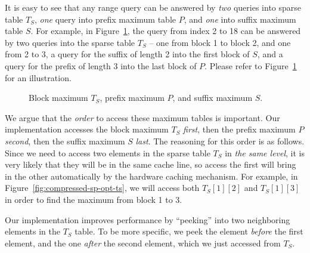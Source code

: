 It is easy to see that any range query can be answered by {\em two}
queries into sparse table $T_S$, {\em one} query into prefix maximum
table $P$, and {\em one} into suffix maximum table $S$.  For example, in
Figure~\ref{fig:compressed-sp-opt}, the query from index 2 to 18 can be
answered by two queries into the sparse table $T_S$ -- one from block 1
to block 2, and one from 2 to 3, a query for the suffix of length 2 into
the first block of $S$, and a query for the prefix of length 3 into the
last block of $P$.  Please refer to Figure~\ref{fig:compressed-sp-opt}
for an illustration.



\begin{figure}[!thb]
  \centering {}  \caption{Block maximum $T_S$, prefix maximum $P$, and suffix maximum $S$.}
  \label{fig:compressed-sp-opt}
\end{figure}

We argue that the {\em order} to access these maximum tables is
important.  Our implementation accesses the block maximum $T_S$ {\em
first}, then the prefix maximum $P$ {\em second}, then the suffix
maximum $S$ {\em last}.  The reasoning for this order is as follows.
Since we need to access two elements in the sparse table $T_S$ in {\em
the same level}, it is very likely that they will be in the same cache
line, so access the first will bring in the other automatically by the
hardware caching mechanism.  For example, in
Figure~\ref{fig:compressed-sp-opt-ts}, we will access both $T_{S}[1][2]$
and $T_{S}[1][3]$ in order to find the maximum from block 1 to 3.

Our implementation improves performance by ``peeking'' into two
neighboring elements in the $T_{S}$ table.  To be more specific, we
peek the element {\em before} the first element, and the one {\em
  after} the second element, which we just accessed from $T_S$.


